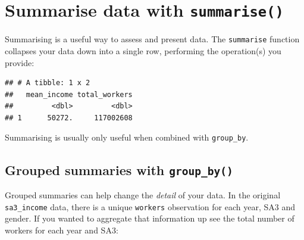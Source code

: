 \documentclass[]{book}
\newenvironment{Shaded}{\begin{snugshade}}{\end{snugshade}}
\newcommand{\CommentTok}[1]{\textcolor[rgb]{0.56,0.35,0.01}{\textit{#1}}}
\newcommand{\DataTypeTok}[1]{\textcolor[rgb]{0.13,0.29,0.53}{#1}}
\newcommand{\KeywordTok}[1]{\textcolor[rgb]{0.13,0.29,0.53}{\textbf{#1}}}
\newcommand{\NormalTok}[1]{#1}
\newcommand{\OperatorTok}[1]{\textcolor[rgb]{0.81,0.36,0.00}{\textbf{#1}}}
\newcommand{\StringTok}[1]{\textcolor[rgb]{0.31,0.60,0.02}{#1}}
\begin{document}
\hypertarget{summarise-data-with-summarise}{%
\section{\texorpdfstring{Summarise data with \texttt{summarise()}}{Summarise data with summarise()}}\label{summarise-data-with-summarise}}

Summarising is a useful way to assess and present data. The \texttt{summarise} function collapses your data down into a single row, performing the operation(s) you provide:

\begin{Shaded}
\end{Shaded}

\begin{verbatim}
## # A tibble: 1 x 2
##   mean_income total_workers
##         <dbl>         <dbl>
## 1      50272.     117002608
\end{verbatim}

Summarising is usually only useful when combined with \texttt{group\_by}.

\hypertarget{grouped-summaries-with-group_by}{%
\subsection{\texorpdfstring{Grouped summaries with \texttt{group\_by()}}{Grouped summaries with group\_by()}}\label{grouped-summaries-with-group_by}}

Grouped summaries can help change the \emph{detail} of your data. In the original \texttt{sa3\_income} data, there is a unique \texttt{workers} observation for each year, SA3 and gender. If you wanted to aggregate that information up see the total number of workers for each year and SA3:

\begin{Shaded}
\end{Shaded}
\end{document}
